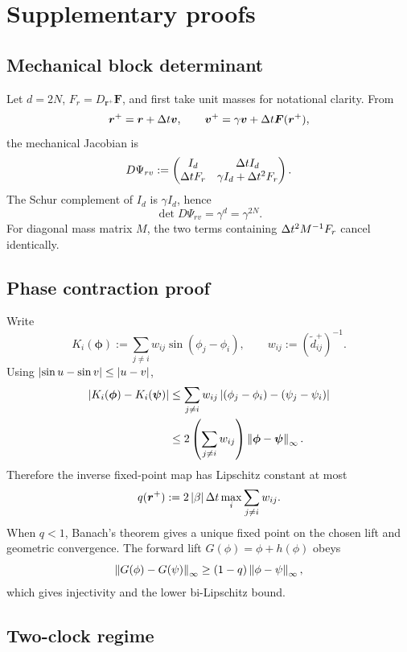 \section{Supplementary proofs}
\label{app:proofs}

\subsection{Mechanical block determinant}

Let \(d=2N\), \(F_r=D_{\bm r^+}\bm F\), and first take unit masses for notational clarity. From
\[
\bm r^+=\bm r+\Delta t\bm v,
\qquad
\bm v^+=\gamma\bm v+\Delta t\bm F(\bm r^+),
\]
the mechanical Jacobian is
\[
D\Psi_{rv}
:=
\begin{pmatrix}
I_d & \Delta t I_d\\
\Delta t F_r & \gamma I_d+\Delta t^2F_r
\end{pmatrix}.
\]
The Schur complement of \(I_d\) is \(\gamma I_d\), hence
\[
\det D\Psi_{rv}=\gamma^d=\gamma^{2N}.
\]
For diagonal mass matrix \(M\), the two terms containing
\(\Delta t^2M^{-1}F_r\) cancel identically.

\subsection{Phase contraction proof}

Write
\[
K_i(\bm\phi)
:=
\sum_{j\neq i}
w_{ij}\sin(\phi_j-\phi_i),
\qquad
w_{ij}
:=
(\widetilde d_{ij}^+)^{-1}.
\]
Using \(\left\lvert \sin u-\sin v\right\rvert\le\left\lvert u-v\right\rvert\),
\begin{align*}
\left\lvert K_i(\bm\phi)-K_i(\bm\psi)\right\rvert
&\le
\sum_{j\neq i}w_{ij}
\left\lvert (\phi_j-\phi_i)-(\psi_j-\psi_i)\right\rvert\\
&\le
2\left(\sum_{j\neq i}w_{ij}\right)
\left\lVert \bm\phi-\bm\psi\right\rVert_\infty.
\end{align*}
Therefore the inverse fixed-point map has Lipschitz constant at most
\[
q(\bm r^+)
:=
2\left\lvert \beta\right\rvert\Delta t
\max_i\sum_{j\neq i}w_{ij}.
\]
When \(q<1\), Banach's theorem gives a unique fixed point on the chosen lift and geometric convergence. The forward lift \(G(\phi)=\phi+h(\phi)\) obeys
\[
\left\lVert G(\phi)-G(\psi)\right\rVert_\infty
\ge
(1-q)\left\lVert \phi-\psi\right\rVert_\infty,
\]
which gives injectivity and the lower bi-Lipschitz bound.

\subsection{Two-clock regime}

